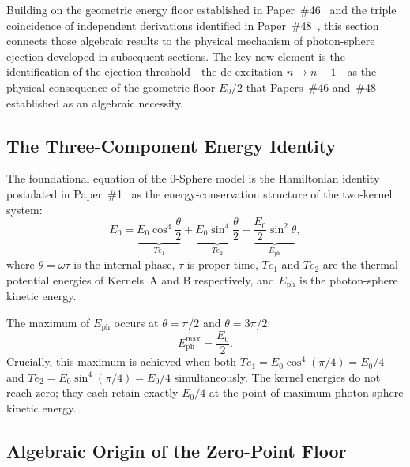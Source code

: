\documentclass[%
 reprint, amsmath,amssymb, aps, prb, ]{revtex4-2}
\numberwithin{equation}{section}
\newcommand{\iphase}{\theta}
\begin{document}
Building on the geometric energy floor established in Paper~\#46~\cite{hanamura46} and the triple coincidence of independent derivations identified in Paper~\#48~\cite{hanamura48}, this section connects those algebraic results to the physical mechanism of photon-sphere ejection developed in subsequent sections. The key new element is the identification of the ejection threshold---the de-excitation $n \to n-1$---as the physical consequence of the geometric floor $E_0/2$ that Papers~\#46 and~\#48 established as an algebraic necessity.

\subsection{The Three-Component Energy Identity}
\label{sec:zpe_identity}

The foundational equation of the 0-Sphere model is the Hamiltonian identity postulated in Paper~\#1~\cite{hanamura01} as the energy-conservation structure of the two-kernel system:
\begin{equation}
E_0 = \underbrace{E_0\cos^4\!\frac{\iphase}{2}}_{Te_1} + \underbrace{E_0\sin^4\!\frac{\iphase}{2}}_{Te_2} + \underbrace{\frac{E_0}{2}\sin^2\!\iphase}_{E_{\text{ph}}},
\label{eq:hamiltonian_identity}
\end{equation}
where $\iphase = \omega\tau$ is the internal phase, $\tau$ is proper time, $Te_1$ and $Te_2$ are the thermal potential energies of Kernels~A and B respectively, and $E_{\text{ph}}$ is the photon-sphere kinetic energy.

The maximum of $E_{\text{ph}}$ occurs at $\iphase = \pi/2$ and $\iphase = 3\pi/2$:
\begin{equation}
E_{\text{ph}}^{\max} = \frac{E_0}{2}.
\label{eq:Eph_max}
\end{equation}
Crucially, this maximum is achieved when both $Te_1 = E_0\cos^4(\pi/4) = E_0/4$ and $Te_2 = E_0\sin^4(\pi/4) = E_0/4$ simultaneously. The kernel energies do not reach zero; they each retain exactly $E_0/4$ at the point of maximum photon-sphere kinetic energy.

\subsection{Algebraic Origin of the Zero-Point Floor}
\label{sec:zpe_amgm}
\end{document}
